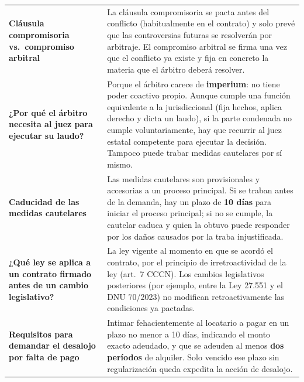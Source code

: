 \documentclass[12pt,oneside]{book}
\begin{document}
\begin{table}[H]
\begin{tabularx}{\textwidth}{
    >{\raggedright\arraybackslash}p{}
    >{\raggedright\arraybackslash}X
}
\textbf{Cláusula compromisoria vs.\ compromiso arbitral} &
La cláusula compromisoria se pacta antes del conflicto (habitualmente
en el contrato) y solo prevé que las controversias futuras se
resolverán por arbitraje. El compromiso arbitral se firma una vez
que el conflicto ya existe y fija en concreto la materia que el
árbitro deberá resolver. \\[0.4em]

\textbf{¿Por qué el árbitro necesita al juez para ejecutar su laudo?} &
Porque el árbitro carece de \textbf{imperium}: no tiene poder coactivo
propio. Aunque cumple una función equivalente a la jurisdiccional (fija
hechos, aplica derecho y dicta un laudo), si la parte condenada no
cumple voluntariamente, hay que recurrir al juez estatal competente
para ejecutar la decisión. Tampoco puede trabar medidas cautelares
por sí mismo. \\[0.4em]

\textbf{Caducidad de las medidas cautelares} &
Las medidas cautelares son provisionales y accesorias a un proceso
principal. Si se traban antes de la demanda, hay un plazo de
\textbf{10 días} para iniciar el proceso principal; si no se cumple,
la cautelar caduca y quien la obtuvo puede responder por los daños
causados por la traba injustificada. \\[0.4em]

\textbf{¿Qué ley se aplica a un contrato firmado antes de un cambio legislativo?} &
La ley vigente al momento en que se acordó el contrato, por el
principio de irretroactividad de la ley (art.\ 7 CCCN). Los cambios
legislativos posteriores (por ejemplo, entre la Ley 27.551 y el DNU
70/2023) no modifican retroactivamente las condiciones ya pactadas. \\[0.4em]

\textbf{Requisitos para demandar el desalojo por falta de pago} &
Intimar fehacientemente al locatario a pagar en un plazo no menor
a 10 días, indicando el monto exacto adeudado, y que se adeuden al
menos \textbf{dos períodos} de alquiler. Solo vencido ese plazo sin
regularización queda expedita la acción de desalojo. \\[0.4em]

\midrule


\end{tabularx}
\end{table}
\end{document}
